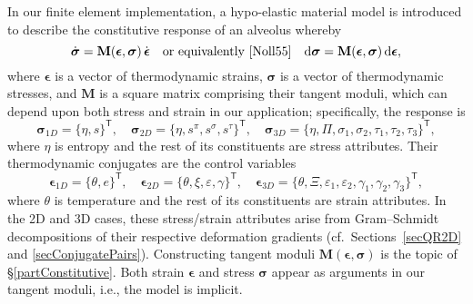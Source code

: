 In our finite element implementation, a hypo-elastic material model \cite{Truesdell55} is introduced to describe the constitutive response of an alveolus whereby
\begin{displaymath}
    \dot{\boldsymbol{\sigma}} = \mathbf{M} ( \boldsymbol{\epsilon} , \boldsymbol{\sigma} ) \, \dot{\boldsymbol{\epsilon}} 
    \quad \text{or equivalently \cite{Noll55}} \quad
    \mathrm{d} \boldsymbol{\sigma} = \mathbf{M} ( \boldsymbol{\epsilon} , \boldsymbol{\sigma} ) \, \mathrm{d} \boldsymbol{\epsilon},
\end{displaymath} 
where $\boldsymbol{\epsilon}$ is a vector of thermo\-dynamic strains, $\boldsymbol{\sigma}$ is a vector of thermo\-dynamic stresses, and $\mathbf{M}$ is a square matrix comprising their tangent moduli, which can depend upon both stress and strain in our application; specifically, the response is
\begin{displaymath}
   \boldsymbol{\sigma}_{1D} = \{ \eta , s \}^{\mathsf{T}} , \quad
   \boldsymbol{\sigma}_{2D} = \{ \eta , s^{\pi} , s^{\sigma} , s^{\tau} \}^{\mathsf{T}} , \quad
   \boldsymbol{\sigma}_{3D} = \{ \eta , \Pi , \sigma_1 , \sigma_2 , \tau_1 , \tau_2 , \tau_3 \}^{\mathsf{T}},
\end{displaymath}
where $\eta$ is entropy and the rest of its constituents are stress attributes.  Their thermo\-dynamic conjugates are the control variables
\begin{displaymath}
\boldsymbol{\epsilon}_{1D} = \{ \theta , e \}^{\mathsf{T}} , \quad
\boldsymbol{\epsilon}_{2D} = \{ \theta , \xi , \varepsilon , \gamma \}^{\mathsf{T}} , \quad
\boldsymbol{\epsilon}_{3D} = \{ \theta , \Xi , \varepsilon_1 , \varepsilon_2 , \gamma_1 , \gamma_2 , \gamma_3 \}^{\mathsf{T}},
\end{displaymath}
where $\theta$ is temperature and the rest of its constituents are strain attributes.  In the 2D and 3D cases, these stress\slash strain attributes arise from Gram--Schmidt decompositions of their respective deformation gradients (cf.\ Sections~\ref{secQR2D} and \ref{secConjugatePairs}).  Constructing tangent moduli $\mathbf{M} ( \boldsymbol{\epsilon} , \boldsymbol{\sigma} )$ is the topic of \S\ref{partConstitutive}.  Both strain $\boldsymbol{\epsilon}$ and stress $\boldsymbol{\sigma}$ appear as arguments in our tangent moduli, i.e., the model is implicit.


